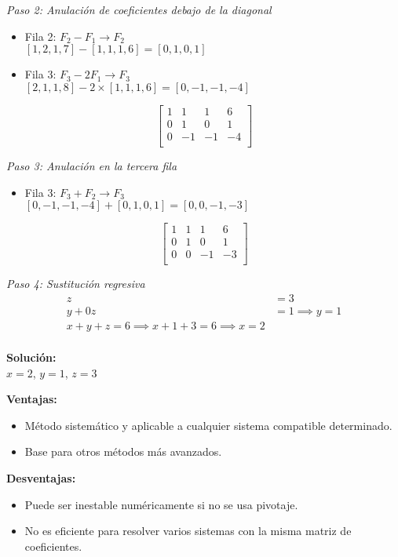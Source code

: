 \documentclass[12pt]{article}
\begin{document}
\textit{Paso 2: Anulación de coeficientes debajo de la diagonal}
\begin{itemize}
    \item Fila 2: $F_2 - F_1 \rightarrow F_2$  \\
    $[1, 2, 1, 7] - [1, 1, 1, 6] = [0, 1, 0, 1]$
    \item Fila 3: $F_3 - 2F_1 \rightarrow F_3$  \\
    $[2, 1, 1, 8] - 2 \times [1, 1, 1, 6] = [0, -1, -1, -4]$
\end{itemize}

\[
\left[
\begin{array}{ccc|c}
1 & 1 & 1 & 6 \\
0 & 1 & 0 & 1 \\
0 & -1 & -1 & -4 \\
\end{array}
\right]
\]

\textit{Paso 3: Anulación en la tercera fila}
\begin{itemize}
    \item Fila 3: $F_3 + F_2 \rightarrow F_3$  \\
    $[0, -1, -1, -4] + [0, 1, 0, 1] = [0, 0, -1, -3]$
\end{itemize}

\[
\left[
\begin{array}{ccc|c}
1 & 1 & 1 & 6 \\
0 & 1 & 0 & 1 \\
0 & 0 & -1 & -3 \\
\end{array}
\right]
\]

\textit{Paso 4: Sustitución regresiva}
\begin{align*}
z &= 3 \\
y + 0z &= 1 \implies y = 1 \\
x + y + z = 6 \implies x + 1 + 3 = 6 \implies x = 2 \\
\end{align*}

\textbf{Solución:}  \\
$x = 2$, $y = 1$, $z = 3$

\textbf{Ventajas:}
\begin{itemize}
    \item Método sistemático y aplicable a cualquier sistema compatible determinado.
    \item Base para otros métodos más avanzados.
\end{itemize}

\textbf{Desventajas:}
\begin{itemize}
    \item Puede ser inestable numéricamente si no se usa pivotaje.
    \item No es eficiente para resolver varios sistemas con la misma matriz de coeficientes.
\end{itemize}
\end{document}
